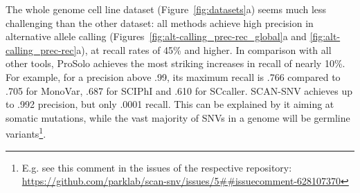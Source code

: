 \documentclass[authoryear,preprint,11pt]{scrartcl}
\begin{document}
The whole genome cell line dataset (Figure~\ref{fig:datasets}a) seems much less challenging than the other dataset: all methods achieve high precision in alternative allele calling (Figures~\ref{fig:alt-calling_prec-rec_global}a and \ref{fig:alt-calling_prec-rec}a), at recall rates of 45\% and higher. 
In comparison with all other tools, ProSolo achieves the most striking increases in recall of nearly 10\%.
For example, for a precision above .99, its maximum recall is .766 compared to .705 for MonoVar, .687 for SCIPhI and .610 for SCcaller.
SCAN-SNV achieves up to .992 precision, but only .0001 recall.
This can be explained by it aiming at somatic mutations, while the vast majority of SNVs in a genome will be germline variants\footnote{E.g. see this comment in the issues of the respective repository: \url{https://github.com/parklab/scan-snv/issues/5##issuecomment-628107370}}.
\end{document}
